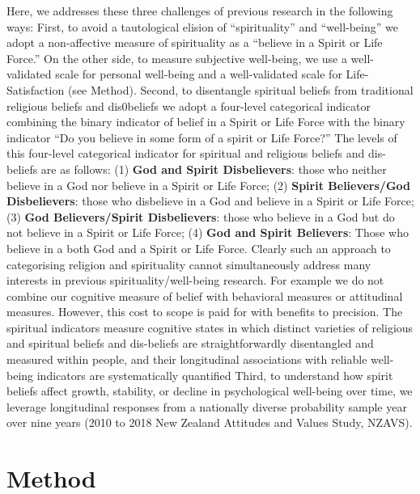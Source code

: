 \documentclass[
  english,
  man,floatsintext]{apa6}
\begin{document}
Here, we addresses these three challenges of previous research in the following ways: First, to avoid a tautological elision of ``spirituality'' and ``well-being'' we adopt a non-affective measure of spirituality as a ``believe in a Spirit or Life Force.'' On the other side, to measure subjective well-being, we use a well-validated scale for personal well-being and a well-validated scale for Life-Satisfaction (see Method). Second, to disentangle spiritual beliefs from traditional religious beliefs and dis0beliefs we adopt a four-level categorical indicator combining the binary indicator of belief in a Spirit or Life Force with the binary indicator ``Do you believe in some form of a spirit or Life Force?'' The levels of this four-level categorical indicator for spiritual and religious beliefs and dis-beliefs are as follows: (1) \textbf{God and Spirit Disbelievers}: those who neither believe in a God nor believe in a Spirit or Life Force; (2) \textbf{Spirit Believers/God Disbelievers}: those who disbelieve in a God and believe in a Spirit or Life Force; (3) \textbf{God Believers/Spirit Disbelievers}: those who believe in a God but do not believe in a Spirit or Life Force; (4) \textbf{God and Spirit Believers}: Those who believe in a both God and a Spirit or Life Force. Clearly such an approach to categorising religion and spirituality cannot simultaneously address many interests in previous spirituality/well-being research. For example we do not combine our cognitive measure of belief with behavioral measures or attitudinal measures. However, this cost to scope is paid for with benefits to precision. The spiritual indicators measure cognitive states in which distinct varieties of religious and spiritual beliefs and dis-beliefs are straightforwardly disentangled and measured within people, and their longitudinal associations with reliable well-being indicators are systematically quantified Third, to understand how spirit beliefs affect growth, stability, or decline in psychological well-being over time, we leverage longitudinal responses from a nationally diverse probability sample year over nine years (2010 to 2018 New Zealand Attitudes and Values Study, NZAVS).

\hypertarget{method}{%
\section{Method}\label{method}}
\end{document}
